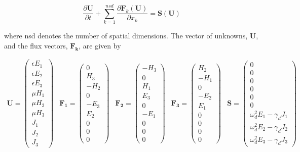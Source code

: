 \documentclass[times,11pt]{ACME2015article}
\newcommand{\mb}[1]{\boldsymbol{#1}}
\newcommand{\pder}[2][]{\frac{\partial#1}{\partial#2}}
\begin{document}
\begin{normalsize}
\begin{equation}\label{maxwell-eqtns}
\pder[\mb{U}]{t} + \sum^{nsd}_{k=1} \pder[\mb{F}_k(\mb{U})]{x_k} = \mb{S}(\mb{U})
\end{equation}

where nsd denotes the number of spatial dimensions. The vector of unknowns, $\bm{U}$, and the flux vectors, $\bm{F_k}$, are given by

\begin{equation}\label{mypaper_eqn:sample_eqation}
\begin{array}{ccccc}
\mb{U} = \begin{pmatrix} \epsilon E_1 \\ \epsilon E_2 \\ \epsilon E_3 \\ \mu H_1 \\ \mu H_2 \\\mu H_3 \\ J_1 \\ J_2 \\ J_3 \end{pmatrix}
&
\mb{F_1} = \begin{pmatrix}0 \\ H_3 \\ - H_2 \\ 0 \\ - E_3 \\ E_2 \\ 0 \\ 0 \\ 0 \end{pmatrix}
&
\mb{F_2} = \begin{pmatrix} -H_3 \\ 0 \\ H_1 \\ E_3 \\ 0 \\ - E_1 \\ 0 \\ 0 \\ 0 \end{pmatrix}
&
\mb{F_3} = \begin{pmatrix} H_2 \\ -H_1 \\ 0 \\ -E_2 \\ E_1 \\ 0 \\ 0 \\ 0 \\ 0 \end{pmatrix}
&
\mb{S} = \begin{pmatrix} 0 \\ 0 \\ 0 \\ 0 \\ 0 \\ 0 \\ \omega_d^2 E_1 - \gamma_d J_1 \\ \omega_d^2 E_2 - \gamma_d J_2 \\ \omega_d^2 E_3 - \gamma_d J_3 \end{pmatrix}
\end{array}
\end{equation}


\end{normalsize}
\end{document}

